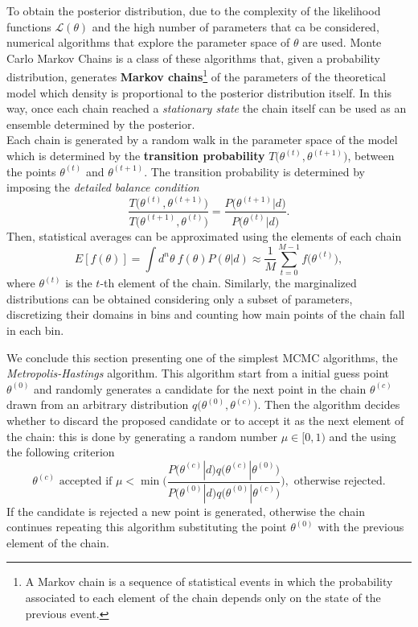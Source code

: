 To obtain the posterior distribution, due to the complexity of the likelihood functions $\mathcal L(\theta)$ and the high number of parameters that ca be considered, numerical algorithms that explore the parameter space of $\theta$ are used. Monte Carlo Markov Chains is a class of these algorithms that, given a probability distribution, generates \textbf{Markov chains}\footnote{A Markov chain is a sequence of statistical events in which the probability associated to each element of the chain depends only on the state of the previous event.} of the parameters of the theoretical model which density is proportional to the posterior distribution itself. In this way, once each chain reached a \emph{stationary state} the chain itself can be used as an ensemble determined by the posterior.\\
Each chain is generated by a random walk in the parameter space of the model which is determined by the \textbf{transition probability} $T\big(\theta^{(t)},\theta^{(t+1)}\big)$, between the points $\theta^{(t)}$ and $\theta^{(t+1)}$. The transition probability is determined by imposing the \emph{detailed balance condition}
$$\frac{T\big(\theta^{(t)},\theta^{(t+1)}\big)}{T\big(\theta^{(t+1)},\theta^{(t)}\big)}=\frac{P\big(\theta^{(t+1)}|d\big)}{P\big(\theta^{(t)}|d\big)}.$$
Then, statistical averages can be approximated using the elements of each chain
$$E[f(\theta)]=\int d^n\theta\ f(\theta)P(\theta|d)\approx\frac1M\sum_{t=0}^{M-1}f\big(\theta^{(t)}\big),$$
where $\theta^{(t)}$ is the $t$-th element of the chain. Similarly, the marginalized distributions can be obtained considering only a subset of parameters, discretizing their domains in bins and counting how main points of the chain fall in each bin.

We conclude this section presenting one of the simplest MCMC algorithms, the \emph{Metropolis-Hastings} algorithm. This algorithm start from a initial guess point $\theta^{(0)}$ and randomly generates a candidate for the next point in the chain $\theta^{(c)}$ drawn from an arbitrary distribution $q\big(\theta^{(0)},\theta^{(c)}\big)$. Then the algorithm decides whether to discard the proposed candidate or to accept it as the next element of the chain: this is done by generating a random number $\mu\in[0,1)$ and the using the following criterion
\begin{equation}
    \theta^{(c)}\text{ accepted if }\mu<\min\Bigg(\frac{P\big(\theta^{(c)}|d\big)q\big(\theta^{(c)}|\theta^{(0)}\big)}{P\big(\theta^{(0)}|d\big)q\big(\theta^{(0)}|\theta^{(c)}\big)}\Bigg),\text{ otherwise rejected.}
\end{equation}
If the candidate is rejected a new point is generated, otherwise the chain continues repeating this algorithm substituting the point $\theta^{(0)}$ with the previous element of the chain.
